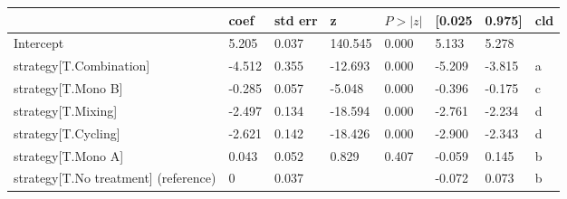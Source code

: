 \begin{tabular}{llllllll}
\toprule
 & coef & std err & z & $P>|z|$ & [0.025 & 0.975] & cld \\
\midrule
Intercept & 5.205 & 0.037 &   140.545 &  0.000 & 5.133 & 5.278 &  \\
strategy[T.Combination] & -4.512 & 0.355 &   -12.693 &  0.000 & -5.209 & -3.815 & a \\
strategy[T.Mono B] & -0.285 & 0.057 &    -5.048 &  0.000 & -0.396 & -0.175 & c \\
strategy[T.Mixing] & -2.497 & 0.134 &   -18.594 &  0.000 & -2.761 & -2.234 & d \\
strategy[T.Cycling] & -2.621 & 0.142 &   -18.426 &  0.000 & -2.900 & -2.343 & d \\
strategy[T.Mono A] & 0.043 & 0.052 &     0.829 &  0.407 & -0.059 & 0.145 & b \\
strategy[T.No treatment] (reference) & 0 & 0.037 &  &  & -0.072 & 0.073 & b \\
\bottomrule
\end{tabular}
